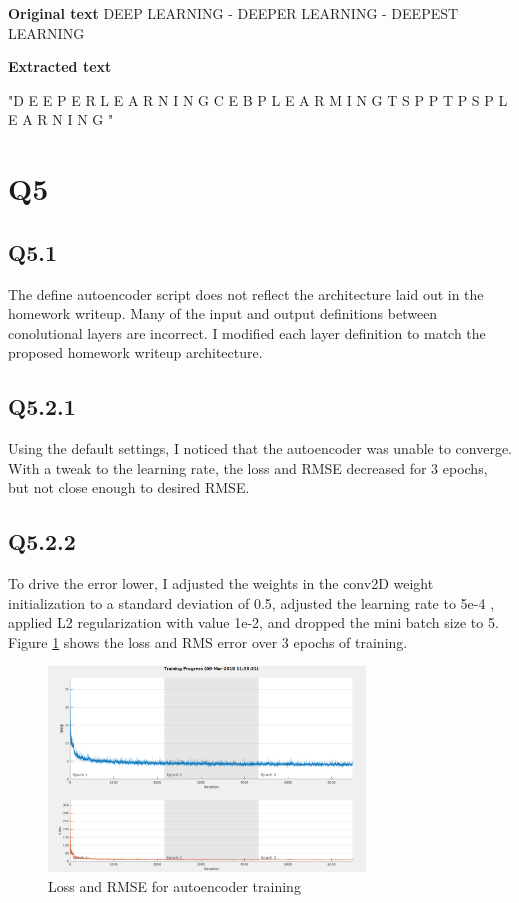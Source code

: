 \documentclass[12pt]{article}
\begin{document}
\textbf { Original text }
DEEP LEARNING  - DEEPER LEARNING - DEEPEST LEARNING

\bigskip

\textbf { Extracted text }

"D E E P E R L E A R N I N G  C E B P L E A R M I N G T  S P P T P S P L E A R N I N G  "


\section{Q5}
\subsection{Q5.1}
The define autoencoder script does not reflect the architecture laid out in the homework writeup. Many of the input and output definitions between conolutional layers are incorrect. I modified each layer definition to match the proposed homework writeup architecture.

\subsection{Q5.2.1}
Using the default settings, I noticed that the autoencoder was unable to converge. With a tweak to the learning rate, the loss and RMSE decreased for 3 epochs, but not close enough to desired RMSE. 

\subsection{Q5.2.2}
To drive the error lower, I adjusted the weights in the conv2D weight initialization to a standard deviation of 0.5, adjusted the learning rate to 5e-4 , applied L2 regularization with value 1e-2, and dropped the mini batch size to 5. Figure \ref{fig:nist36confusion} shows the loss and RMS error over 3 epochs of training.

\begin{figure}[H]
\centering
\includegraphics[page=1,width=0.75\textwidth]{q522_mrse4}
\caption{ Loss and RMSE for autoencoder training } 
\label{fig:nist36confusion}
\end{figure}   
\end{document}
